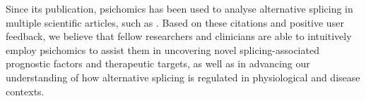 
Since its publication, psichomics has been used to analyse alternative splicing in multiple scientific articles, such as \cite{coomer:2019wz,baeza-centurion:2019tb,munkley:2019wr,kumar:2022aa}. Based on these citations and positive user feedback, we believe that fellow researchers and clinicians are able to intuitively employ psichomics to assist them in uncovering novel splicing-associated prognostic factors and therapeutic targets, as well as in advancing our understanding of how alternative splicing is regulated in physiological and disease contexts.
